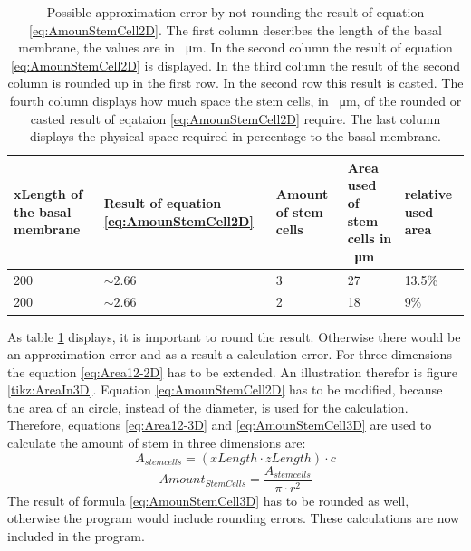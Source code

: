 \begin{table}
\centering
\caption{Possible approximation error by not rounding the result of equation \ref{eq:AmounStemCell2D}. The first column describes the length of the basal membrane, the values are  in \SI{}{\micro\metre}. In the second column the result of equation \ref{eq:AmounStemCell2D} is displayed. In the third column the result of the second column is rounded up in the first row. In the second row this result is casted. The fourth column displays how much space the stem cells, in \SI{}{\micro\metre}, of the rounded or casted result of eqataion \ref{eq:AmounStemCell2D} require. The last column displays the physical space required in percentage to the basal membrane.}
\renewcommand{\arraystretch}{1.5}
	\begin{tabularx}{\textwidth}{X||X||X||X||X}
		xLength of the basal membrane & Result of equation \ref{eq:AmounStemCell2D} & Amount of stem cells & Area used of stem cells  in \SI{}{\micro\metre} & relative used area  \\
		\hline
		200 & $\sim 2.66$ & 3 & 27 & 13.5\% \\
		
		200 & $\sim 2.66$ & 2 & 18 & 9\% 

	\end{tabularx}
	\label{tbl:Approximation error}
\end{table}

As table \ref{tbl:Approximation error} displays, it is important to round the result. Otherwise there would be an approximation error and as a result a calculation error. \newline
For three dimensions the equation \ref{eq:Area12-2D} has to be extended. An illustration therefor is figure \ref{tikz:AreaIn3D}. Equation \ref{eq:AmounStemCell2D} has to be modified, because the area of an circle, instead of the diameter, is used for the calculation. Therefore, equations \ref{eq:Area12-3D} and \ref{eq:AmounStemCell3D} are used to calculate the amount of stem in three dimensions are:
\begin{equation}\label{eq:Area12-3D}
A_{stem cells} = (xLength \cdot zLength) \cdot c
\end{equation}
\begin{equation}\label{eq:AmounStemCell3D}
Amount_{StemCells} = \dfrac{A_{stem cells}}{\pi \cdot r^{2}} 
\end{equation}
The result of formula \ref{eq:AmounStemCell3D} has to be rounded as well, otherwise the program would include rounding errors. 
These calculations are now included in the program.

